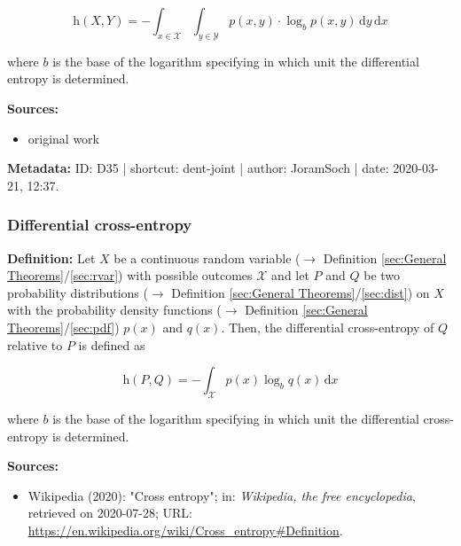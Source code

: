 \documentclass[a4paper,12pt,twoside]{book}
\begin{document}
\begin{equation} \label{eq:dent-joint-dent-joint}
\mathrm{h}(X,Y) = - \int_{x \in \mathcal{X}} \int_{y \in \mathcal{Y}} p(x,y) \cdot \log_b p(x,y) \, \mathrm{d}y \, \mathrm{d}x
\end{equation}

where $b$ is the base of the logarithm specifying in which unit the differential entropy is determined.


\vspace{1em}
\textbf{Sources:}
\begin{itemize}
\item original work\end{itemize}


\vspace{1em}
\textbf{Metadata:} ID: D35 | shortcut: dent-joint | author: JoramSoch | date: 2020-03-21, 12:37.
\vspace{1em}



\subsubsection[\textit{Differential cross-entropy}]{Differential cross-entropy} \label{sec:dent-cross}
\setcounter{equation}{0}

\textbf{Definition:} Let $X$ be a continuous random variable ($\rightarrow$ Definition \ref{sec:General Theorems}/\ref{sec:rvar}) with possible outcomes $\mathcal{X}$ and let $P$ and $Q$ be two probability distributions ($\rightarrow$ Definition \ref{sec:General Theorems}/\ref{sec:dist}) on $X$ with the probability density functions ($\rightarrow$ Definition \ref{sec:General Theorems}/\ref{sec:pdf}) $p(x)$ and $q(x)$. Then, the differential cross-entropy of $Q$ relative to $P$ is defined as

\begin{equation} \label{eq:dent-cross-dent-cross}
\mathrm{h}(P,Q) = - \int_{\mathcal{X}} p(x) \log_b q(x) \, \mathrm{d}x
\end{equation}

where $b$ is the base of the logarithm specifying in which unit the differential cross-entropy is determined.


\vspace{1em}
\textbf{Sources:}
\begin{itemize}
\item Wikipedia (2020): "Cross entropy"; in: \textit{Wikipedia, the free encyclopedia}, retrieved on 2020-07-28; URL: \url{https://en.wikipedia.org/wiki/Cross_entropy#Definition}.
\end{itemize}
\end{document}
